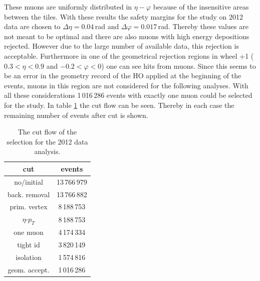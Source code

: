 			These muons are uniformly distributed in $\eta-\varphi$ because of the insensitive areas between the tiles.
			With these results the safety margins for the study on 2012 data are chosen to $\Delta\eta = 0.04$\,rad and $\Delta\varphi = 0.017$\,rad.
			Thereby these values are not meant to be optimal and there are also muons with high energy depositions rejected.
			However due to the large number of available data, this rejection is acceptable.
			Furthermore in one of the geometrical rejection regions in wheel +1 ($0.3<\eta<0.9$ and $-0.2<\varphi<0$) one can see hits from muons.
			Since this seems to be an error in the geometry record of the HO applied at the beginning of the events, muons in this region are not considered for the following analyses.
			With all these considerations 1\,016\,286 events with exactly one muon could be selected for the study.
			In table \ref{CutFlow} the cut flow can be seen.
			Thereby in each case the remaining number of events after cut is shown.
			\begin{table}[htbH]
				\begin{center}
					\begin{tabular}{|c|c|}
						\hline
						\textbf{cut}  & \textbf{events} \\ \hline \hline
			 			no/initial    & 13\,766\,979 		\\ \hline
			 			back. removal & 13\,766\,882 		\\ \hline
			 			prim. vertex  &  8\,188\,753 		\\ \hline
			 			$\eta$-$p_T$  &  8\,188\,753 		\\ \hline
			 			one muon      &  4\,174\,334 		\\ \hline
			 			tight id      &  3\,820\,149 		\\ \hline
			 			isolation     &  1\,574\,816 		\\ \hline
			 			geom. accept. &  1\,016\,286 		\\ \hline
					\end{tabular}
				\end{center}
				\caption{The cut flow of the selection for the 2012 data analysis.}
				\label{CutFlow}
			\end{table}
